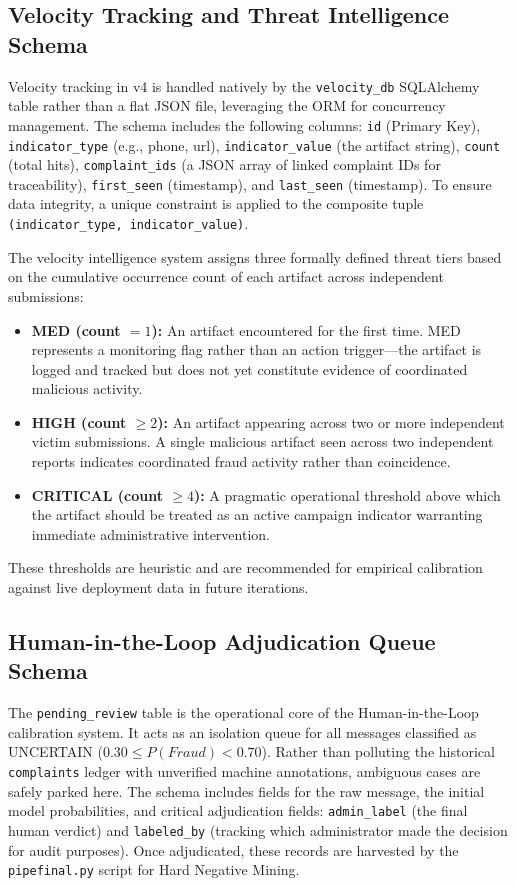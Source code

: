 \subsection{Velocity Tracking and Threat Intelligence Schema}
Velocity tracking in v4 is handled natively by the \texttt{velocity\_db} SQLAlchemy table rather than a flat JSON file, leveraging the ORM for concurrency management. The schema includes the following columns: \texttt{id} (Primary Key), \texttt{indicator\_type} (e.g., phone, url), \texttt{indicator\_value} (the artifact string), \texttt{count} (total hits), \texttt{complaint\_ids} (a JSON array of linked complaint IDs for traceability), \texttt{first\_seen} (timestamp), and \texttt{last\_seen} (timestamp). To ensure data integrity, a unique constraint is applied to the composite tuple \texttt{(indicator\_type, indicator\_value)}.

The velocity intelligence system assigns three formally defined threat tiers based on the cumulative occurrence count of each artifact across independent submissions:
\begin{itemize}
    \item \textbf{MED (count $= 1$):} An artifact encountered for the first time. MED represents a monitoring flag rather than an action trigger---the artifact is logged and tracked but does not yet constitute evidence of coordinated malicious activity.
    \item \textbf{HIGH (count $\geq 2$):} An artifact appearing across two or more independent victim submissions. A single malicious artifact seen across two independent reports indicates coordinated fraud activity rather than coincidence.
    \item \textbf{CRITICAL (count $\geq 4$):} A pragmatic operational threshold above which the artifact should be treated as an active campaign indicator warranting immediate administrative intervention.
\end{itemize}
These thresholds are heuristic and are recommended for empirical calibration against live deployment data in future iterations.

\subsection{Human-in-the-Loop Adjudication Queue Schema}
The \texttt{pending\_review} table is the operational core of the Human-in-the-Loop calibration system. It acts as an isolation queue for all messages classified as UNCERTAIN ($0.30 \leq P(Fraud) < 0.70$). Rather than polluting the historical \texttt{complaints} ledger with unverified machine annotations, ambiguous cases are safely parked here. The schema includes fields for the raw message, the initial model probabilities, and critical adjudication fields: \texttt{admin\_label} (the final human verdict) and \texttt{labeled\_by} (tracking which administrator made the decision for audit purposes). Once adjudicated, these records are harvested by the \texttt{pipefinal.py} script for Hard Negative Mining.


